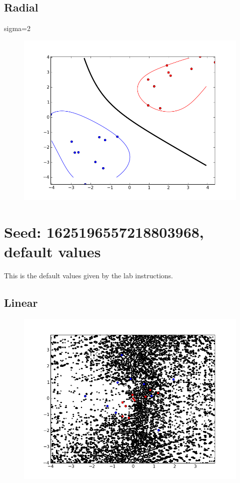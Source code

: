 \documentclass{article}
\begin{document}
\subsection{Radial}
sigma=2
\begin{figure}[H]
    \centering
    \includegraphics[width=1.0\linewidth]{../img/radial_s1_ez_s2.png}
\end{figure}

\section{Seed: 1625196557218803968, default values}
This is the default values given by the lab instructions.

\subsection{Linear}

\begin{figure}[H]
    \centering
    \includegraphics[width=1.0\linewidth]{../img/linear_s1.png}
\end{figure}
\end{document}
